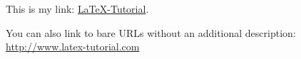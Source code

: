 \documentclass{article}
\begin{document}
This is my link: \href{http://www.latex-tutorial.com}{LaTeX-Tutorial}.

You can also link to bare URLs without an additional description: \url{http://www.latex-tutorial.com}
\end{document}
